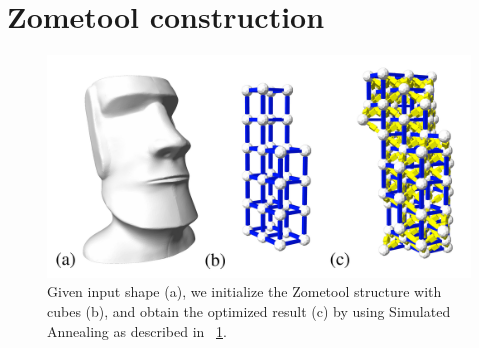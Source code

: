 \section{Zometool construction}
\label{sec:Zometool}

\begin{figure}[ht]
\centering
\includegraphics[width=\linewidth]{figs/Zometool_init.pdf} 
\caption{
Given input shape (a), we initialize the Zometool structure with cubes (b), and obtain the optimized result (c) by using Simulated Annealing as described in \secname~\ref{sec:Zometool}.}
\label{fig:Zometool_cont}
\end{figure}


